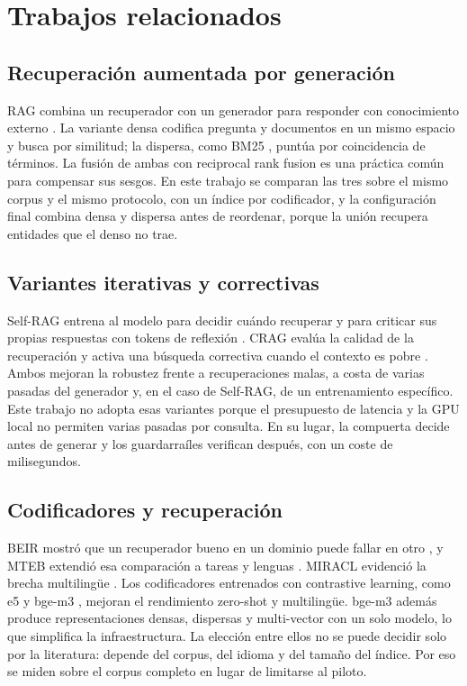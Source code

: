 \section{Trabajos relacionados}
\label{sec:relacionados}

\subsection{Recuperaci\'on aumentada por generaci\'on}

RAG combina un recuperador con un generador para responder con conocimiento externo \cite{lewis2020rag}. La variante densa codifica pregunta y documentos en un mismo espacio y busca por similitud; la dispersa, como BM25 \cite{robertson2009bm25}, punt\'ua por coincidencia de t\'erminos. La fusi\'on de ambas con reciprocal rank fusion \cite{cormack2009rrf} es una pr\'actica com\'un para compensar sus sesgos. En este trabajo se comparan las tres sobre el mismo corpus y el mismo protocolo, con un \'indice por codificador, y la configuraci\'on final combina densa y dispersa antes de reordenar, porque la uni\'on recupera entidades que el denso no trae.

\subsection{Variantes iterativas y correctivas}

Self-RAG entrena al modelo para decidir cu\'ando recuperar y para criticar sus propias respuestas con tokens de reflexi\'on \cite{asai2023selfrag}. CRAG eval\'ua la calidad de la recuperaci\'on y activa una b\'usqueda correctiva cuando el contexto es pobre \cite{yan2024crag}. Ambos mejoran la robustez frente a recuperaciones malas, a costa de varias pasadas del generador y, en el caso de Self-RAG, de un entrenamiento espec\'ifico. Este trabajo no adopta esas variantes porque el presupuesto de latencia y la GPU local no permiten varias pasadas por consulta. En su lugar, la compuerta decide antes de generar y los guardarra\'iles verifican despu\'es, con un coste de milisegundos.

\subsection{Codificadores y recuperaci\'on}

BEIR mostr\'o que un recuperador bueno en un dominio puede fallar en otro \cite{thakur2021beir}, y MTEB extendi\'o esa comparaci\'on a tareas y lenguas \cite{muennighoff2023mteb}. MIRACL evidenci\'o la brecha multiling\"ue \cite{zhang2023miracl}. Los codificadores entrenados con contrastive learning, como e5 \cite{wang2024e5} y bge-m3 \cite{chen2024bge}, mejoran el rendimiento zero-shot y multiling\"ue. bge-m3 adem\'as produce representaciones densas, dispersas y multi-vector con un solo modelo, lo que simplifica la infraestructura. La elecci\'on entre ellos no se puede decidir solo por la literatura: depende del corpus, del idioma y del tama\~no del \'indice. Por eso se miden sobre el corpus completo en lugar de limitarse al piloto.

